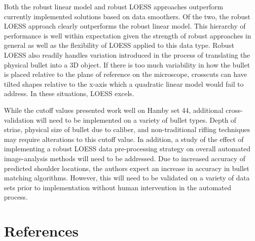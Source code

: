 \documentclass[]{article}
\begin{document}
Both the robust linear model and robust LOESS approaches outperform
currently implemented solutions based on data smoothers. Of the two, the
robust LOESS approach clearly outperforms the robust linear model. This
hierarchy of performance is well within expectation given the strength
of robust approaches in general as well as the flexibility of LOESS
applied to this data type. Robust LOESS also readily handles variation
introduced in the process of translating the physical bullet into a 3D
object. If there is too much variability in how the bullet is placed
relative to the plane of reference on the microscope, crosscuts can have
tilted shapes relative to the x-axis which a quadratic linear model
would fail to address. In these situations, LOESS excels.

While the cutoff values presented work well on Hamby set 44, additional
cross-validation will need to be implemented on a variety of bullet
types. Depth of striae, physical size of bullet due to caliber, and
non-traditional rifling techniques may require alterations to this
cutoff value. In addition, a study of the effect of implementing a
robust LOESS data pre-processing strategy on overall automated
image-analysis methods will need to be addressed. Due to increased
accuracy of predicted shoulder locations, the authors expect an increase
in accuracy in bullet matching algorithms. However, this will need to be
validated on a variety of data sets prior to implementation without
human intervention in the automated process.

\section{References}


\end{document}
